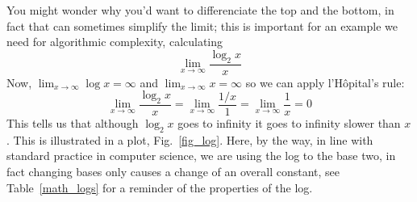 \documentclass[11pt,a4paper]{scrartcl}
\begin{document}
You might wonder why you'd want to differenciate the top and the
bottom, in fact that can sometimes simplify the limit; this is
important for an example we need for algorithmic complexity, calculating
\begin{equation}
\lim_{x\rightarrow \infty}\frac{\log_2{x}}{x}
\end{equation}
Now, $\lim_{x\rightarrow\infty}\log{x}=\infty$ and $\lim_{x\rightarrow \infty}x=\infty$ so we can apply l'H\^{o}pital's rule:
\begin{equation}
\lim_{x\rightarrow \infty}\frac{\log_2{x}}{x}=\lim_{x\rightarrow \infty}\frac{1/x}{1}=\lim_{x\rightarrow \infty}\frac{1}{x}=0
\end{equation}
This tells us that although $\log_2{x}$ goes to infinity it goes to
infinity slower than $x$.  This is illustrated in a plot,
Fig.~\ref{fig_log}. Here, by the way, in line with standard
practice in computer science, we are using the log to the base two, in
fact changing bases only causes a change of an overall constant, see
Table~\ref{math_logs} for a reminder of the properties of the log.
\end{document}
